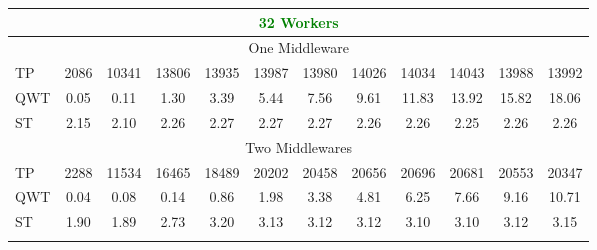 \documentclass[11pt,a4paper]{article}
\let\tb\textbf
\begin{document}
\begin{table}[H]
\begin{center}
{{\begin{tabular}{|l||c|c|c|c|c|c|c|c|c|c|c|}
        
        \multicolumn{12}{|c|}{\textcolor{Green}{\tb{32 Workers}}}        \\ \hline
        \multicolumn{12}{|c|}{One Middleware} \\ \hline
        TP    &         2086    &   10341    &   13806    &   13935    &   13987   &    13980   &    14026   &    14034    &   14043   &    13988    &   13992 \\ \hline
        QWT    &        0.05     &   0.11    &    1.30    &    3.39    &    5.44   &     7.56   &     9.61   &    11.83   &    13.92   &    15.82   &    18.06 \\ \hline
        ST      &       2.15      &  2.10    &   2.26     &   2.27      &  2.27       & 2.27  &      2.26    &    2.26     &   2.25  &      2.26    &    2.26 \\ \hline
        \multicolumn{12}{|c|}{Two Middlewares} \\ \hline
        TP        &     2288   &    11534  &     16465   &   18489   &    20202   &    20458  &     20656   &    20696   &    20681   &    20553  &     20347 \\ \hline
        QWT       &     0.04   &     0.08    &    0.14     &   0.86   &     1.98   &     3.38   &     4.81    &    6.25   &     7.66   &     9.16   &    10.71 \\ \hline
        ST        &     1.90   &     1.89    &    2.73    &    3.20     &   3.13   &     3.12   &     3.12    &    3.10    &    3.10   &     3.12   &     3.15 \\ \Xhline{4\arrayrulewidth}
        

\end{tabular}}}
\end{center}
\end{table}
\end{document}
